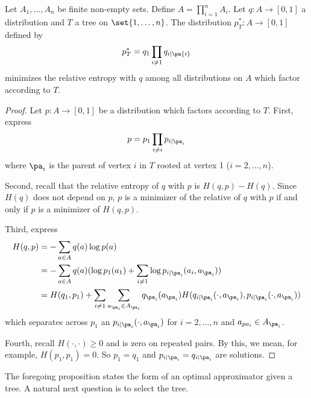 \begin{proposition}

\label{prop:treeapproximators}Let $A_1, \dots  , A_n$ be finite non-empty sets.
Define $A = \prod_{i = 1}^{n} A_i$.
Let $q: A \to [0, 1]$ a distribution and $T$ a tree on $\set{1, \dots  , n}$.
The distribution $p^*_T: A \to [0, 1]$ defined by
    \[
p^*_T = q_1 \prod_{i \neq 1} q_{i \mid \pa{i}}
    \]
minimizes the relative entropy with $q$ among all distributions on $A$ which factor according to $T$.

\begin{proof}Let $p: A \to [0, 1]$ be a distribution which factors according to $T$.
First, express
    \[
p = p_1 \prod_{i \neq i} p_{i \mid \pa_i}
    \]
where $\pa_i$ is the parent of vertex $i$ in $T$ rooted at vertex 1 ($i = 2, \dots  , n$).

Second, recall that the relative entropy of $q$ with $p$ is $H(q, p) - H(q)$.
Since $H(q)$ does not depend on $p$, $p$ is a minimizer of the relative of $q$ with $p$ if and only if $p$ is a minimizer of $H(q, p)$.

Third, express
    \[
\begin{aligned}
H(q, p) &= - \sum_{a \in A} q(a) \log p(a) \\
&= - \sum_{a \in A} q(a) (\log p_1(a_1) + \sum_{i \neq 1} \log p_{i \mid \pa_i}(a_i, a_{\pa_i})) \\
&= H(q_1, p_1) + \sum_{i \neq 1} \sum_{a_{\pa_i} \in A_{\pa_i}} q_{\pa_i}(a_{\pa_i})H(q_{i\mid\pa_i}(\cdot , a_{\pa_i}), p_{i\mid\pa_i}(\cdot , a_{\pa_i}))
\end{aligned}
    \]
which separates across $p_1$ an $p_{i \mid \pa_i}(\cdot , a_{\pa_i})$ for $i = 2, \dots  , n$ and $a_{pa_i} \in A_{\pa_i}$.

Fourth, recall $H(\cdot , \cdot ) \geq 0$ and is zero on repeated pairs.
By this, we mean, for example, $H(p_1, p_1) = 0$.
So $p_1 = q_1$ and $p_{i \mid \pa_i} = q_{i \mid \pa_i}$ are solutions.
\end{proof}\end{proposition}
The foregoing proposition states the form of an optimal approximator given a tree.
A natural next question is to select the tree.
